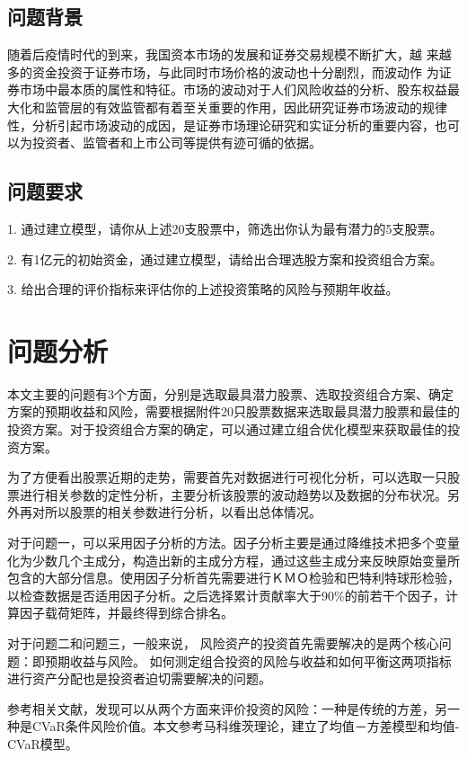 \documentclass[withoutpreface,bwprint]{cumcmthesis} %
\begin{document}
	\subsection{问题背景}
	随着后疫情时代的到来，我国资本市场的发展和证券交易规模不断扩大，越 来越多的资金投资于证券市场，与此同时市场价格的波动也十分剧烈，而波动作 为证券市场中最本质的属性和特征。市场的波动对于人们风险收益的分析、股东权益最大化和监管层的有效监管都有着至关重要的作用，因此研究证券市场波动的规律性，分析引起市场波动的成因，是证券市场理论研究和实证分析的重要内容，也可以为投资者、监管者和上市公司等提供有迹可循的依据。
	
	\subsection{问题要求}
	1. 通过建立模型，请你从上述20支股票中，筛选出你认为最有潜力的5支股票。
	
	2.  有1亿元的初始资金，通过建立模型，请给出合理选股方案和投资组合方案。
	
	3.  给出合理的评价指标来评估你的上述投资策略的风险与预期年收益。
	
	\section{问题分析}
	本文主要的问题有3个方面，分别是选取最具潜力股票、选取投资组合方案、确定方案的预期收益和风险，需要根据附件20只股票数据来选取最具潜力股票和最佳的投资方案。对于投资组合方案的确定，可以通过建立组合优化模型来获取最佳的投资方案。
	
	为了方便看出股票近期的走势，需要首先对数据进行可视化分析，可以选取一只股票进行相关参数的定性分析，主要分析该股票的波动趋势以及数据的分布状况。另外再对所以股票的相关参数进行分析，以看出总体情况。
	
	对于问题一，可以采用因子分析的方法。因子分析主要是通过降维技术把多个变量化为少数几个主成分，构造出新的主成分方程，通过这些主成分来反映原始变量所包含的大部分信息。使用因子分析首先需要进行ＫＭＯ检验和巴特利特球形检验，以检查数据是否适用因子分析。之后选择累计贡献率大于90\%的前若干个因子，计算因子载荷矩阵，并最终得到综合排名。
	
	对于问题二和问题三，一般来说， 风险资产的投资首先需要解决的是两个核心问题：即预期收益与风险。 如何测定组合投资的风险与收益和如何平衡这两项指标进行资产分配也是投资者迫切需要解决的问题。
	
	参考相关文献，发现可以从两个方面来评价投资的风险：一种是传统的方差，另一种是CVaR条件风险价值。本文参考马科维茨理论，建立了均值－方差模型和均值-CVaR模型。
	
\end{document}
